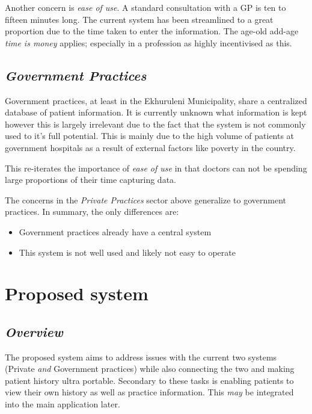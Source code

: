 \documentclass[a4paper]{article}
\begin{document}
Another concern is \emph{ease of use}. A standard consultation with a GP is ten to fifteen minutes long. The current system has been streamlined to a great proportion due to the time taken to enter the information. The age-old add-age \emph{time is money} applies; especially in a profession as highly incentivised as this.

\subsection{\textit{Government Practices}}
Government practices, at least in the Ekhuruleni Municipality, share a centralized database of patient information. It is currently unknown what information is kept however this is largely irrelevant due to the fact that the system is not commonly used to it's full potential. This is mainly due to the high volume of patients at government hospitals as a result of external factors like poverty in the country.

This re-iterates the importance of \emph{ease of use} in that doctors can not be spending large proportions of their time capturing data.

The concerns in the \emph{Private Practices} sector above generalize to government practices. In summary, the only differences are:
\begin{itemize}
	\item Government practices already have a central system
	\item This system is not well used and likely not easy to operate
\end{itemize}
	
\newpage

\section{Proposed system}
\subsection{\textit{Overview}}
The proposed system aims to address issues with the current two systems (Private \emph{and} Government practices) while also connecting the two and making patient history ultra portable. Secondary to these tasks is enabling patients to view their own history as well as practice information. This \emph{may} be integrated into the main application later.
		
\end{document}
